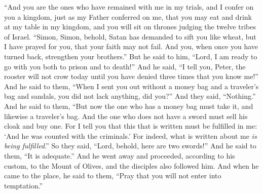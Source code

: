\begin{biblechapter}
\verse “And you are the ones who have remained with me in my trials,
\verse and I confer on you a kingdom, just as my Father conferred on me,
\verse that you may eat and drink at my table in my kingdom, and you will sit on thrones judging the twelve tribes of Israel.
 “Simon, Simon, behold, Satan has demanded to sift you like wheat,
\verse but I have prayed for you, that your faith may not fail. And you, when once you have turned back, strengthen your brothers.”
\verse But he said to him, “Lord, I am ready to go with you both to prison and to death!”
\verse And he said, “I tell you, Peter, the rooster will not crow today until you have denied three times that you know me!”
 And he said to them, “When I sent you out without a money bag and a traveler’s bag and sandals, you did not lack anything, did you?” And they said, “Nothing.”
\verse And he said to them, “But now the one who has a money bag must take it, and likewise a traveler’s bag. And the one who does not have a sword must sell his cloak and buy one.
\verse For I tell you that this that is written must be fulfilled in me: ‘And he was counted with the criminals.’ For indeed, what is written about me \textit{is being fulfilled}.”
\verse So they said, “Lord, behold, here are two swords!” And he said to them, “It is adequate.”
 And he went away and proceeded, according to his custom, to the Mount of Olives, and the disciples also followed him.
\verse And when he came to the place, he said to them, “Pray that you will not enter into temptation.”

\end{biblechapter}
